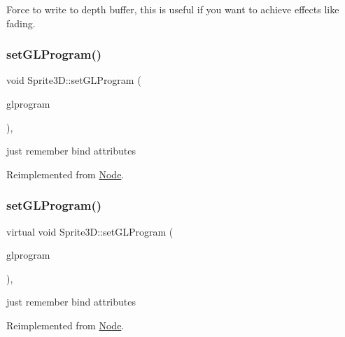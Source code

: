 Force to write to depth buffer, this is useful if you want to achieve effects like fading. \mbox{\label{classSprite3D_addcfa64162310ce40ec097738442af9f}} 
\subsubsection{\texorpdfstring{set\+G\+L\+Program()}{setGLProgram()}\hspace{0.1cm}{\footnotesize\ttfamily [1/2]}}
{\footnotesize\ttfamily void Sprite3\+D\+::set\+G\+L\+Program (\begin{DoxyParamCaption}\item[{\hyperlink{classGLProgram}{G\+L\+Program} $\ast$}]{glprogram }\end{DoxyParamCaption})\hspace{0.3cm}{\ttfamily [override]}, {\ttfamily [virtual]}}

just remember bind attributes 

Reimplemented from \hyperlink{classNode_a16ac830f1b38ae931da062c0833b2db0}{Node}.

\mbox{\label{classSprite3D_aa71609d7f3a35a0d86a70f28bafffa9c}} 
\subsubsection{\texorpdfstring{set\+G\+L\+Program()}{setGLProgram()}\hspace{0.1cm}{\footnotesize\ttfamily [2/2]}}
{\footnotesize\ttfamily virtual void Sprite3\+D\+::set\+G\+L\+Program (\begin{DoxyParamCaption}\item[{\hyperlink{classGLProgram}{G\+L\+Program} $\ast$}]{glprogram }\end{DoxyParamCaption})\hspace{0.3cm}{\ttfamily [override]}, {\ttfamily [virtual]}}

just remember bind attributes 

Reimplemented from \hyperlink{classNode_a16ac830f1b38ae931da062c0833b2db0}{Node}.

\mbox{\label{classSprite3D_ab9e57d29350dc6886360d433c023b935}} 
